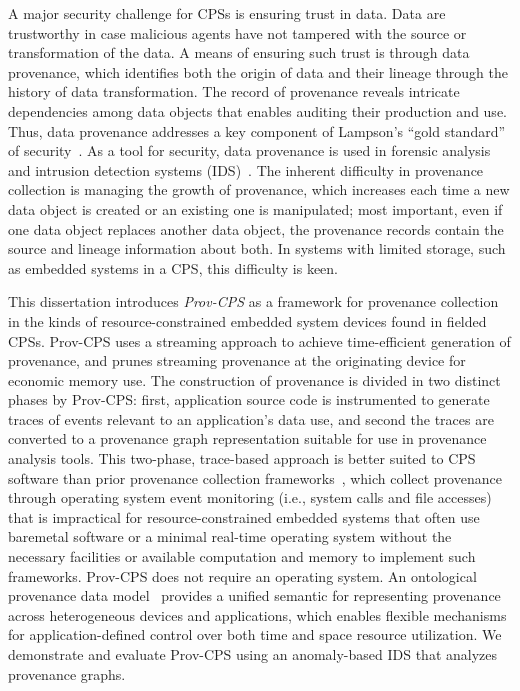 \par A major security challenge for CPSs is ensuring trust in data. Data are trustworthy in case malicious agents have not tampered with the source or transformation of the data. A means of ensuring such trust is through data provenance, which identifies both the origin of data and their lineage through the history of data transformation. The record of provenance reveals intricate dependencies among data objects that enables auditing their production and use. Thus, data provenance addresses a key component of Lampson's ``gold standard'' of security~\cite{lampson_computer_2004}.  As a tool for security, data provenance is used in forensic analysis~\cite{Xie_yulani, LI2014259} and intrusion detection systems (IDS)~\cite{Fadolalkarim, Yoon}. The inherent difficulty in provenance collection is managing the growth of provenance, which increases each time a new data object is created or an existing one is manipulated; most important, even if one data object replaces another data object, the provenance records contain the source and lineage information about both. In systems with limited storage, such as embedded systems in a CPS, this difficulty is keen.

\par This dissertation introduces {\em Prov-CPS} as a framework for provenance collection in the kinds of resource-constrained embedded system devices found in fielded CPSs. Prov-CPS uses a streaming approach to achieve time-efficient generation of provenance, and prunes streaming provenance at the originating device for economic memory use. The construction of provenance is divided in two distinct phases by Prov-CPS: first, application source code is instrumented to generate traces of events relevant to an application's data use, and second the traces are converted to a provenance graph representation suitable for use in provenance analysis tools. This two-phase, trace-based approach is better suited to CPS software than prior provenance collection frameworks~\cite{hi_fi, muniswamy_reddy, 190900}, which collect provenance through operating system event monitoring (i.e., system calls and file accesses) that is impractical for resource-constrained embedded systems that often use baremetal software or a minimal real-time operating system without the necessary facilities or available computation and memory to implement such frameworks. Prov-CPS does not require an operating system. An ontological provenance data model~\cite{prov_dm} provides a unified semantic for representing provenance across heterogeneous devices and applications, which enables flexible mechanisms for application-defined control over both time and space resource utilization. We demonstrate and evaluate Prov-CPS using an anomaly-based IDS that analyzes provenance graphs. 

